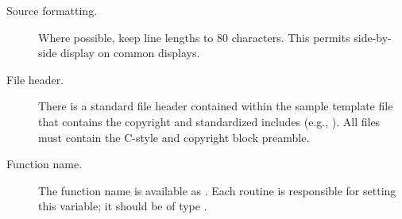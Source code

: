 \documentclass{article}
\begin{document}
\begin{description}


\item[Source formatting.] 
Where possible, keep line lengths to 80 characters.  This permits
side-by-side display on common displays.  

\item[File header.]
There is a standard file header contained within the sample template
file  that contains the copyright and
standardized includes (e.g., ).  All files must
contain the C-style and copyright block preamble.

\item[Function name.]
The function name is available as .  Each routine is responsible
for setting this variable; it should be of type .





\end{description}
\end{document}
